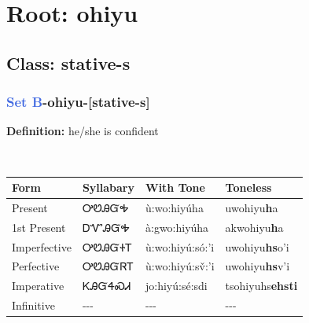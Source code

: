 \needspace{4in}
\section*{Root: ohiyu}
\nopagebreak
{}
\needspace{3in}
\subsection*{Class: stative-s}
\nopagebreak
\needspace{2in}
\subsubsection*{\textcolor{RoyalBlue}{Set B}{-}\textbf{ohiyu}{-}[stative-s]}
\nopagebreak
\textbf{Definition: } he/she is confident
\\[0.5em]
\begin{tabularx}{\textwidth}{l X X X}%
\toprule%
\textbf{Form}&\textbf{Syllabary}&\textbf{With Tone}&\textbf{Toneless}\\%
\midrule%
Present&ᎤᏬᎯᏳᎭ&ù:wo:hiyúha&uwohiyu\textbf{h}a\\%
1st Present&ᎠᏉᎯᏳᎭ&à:gwo:hiyúha&akwohiyu\textbf{h}a\\%
Imperfective&ᎤᏬᎯᏳᏐᎢ&ù:wo:hiyú:só:’i&uwohiyu\textbf{hs}o'i\\%
Perfective&ᎤᏬᎯᏳᏒᎢ&ù:wo:hiyú:sv̌:’i&uwohiyu\textbf{hs}v'i\\%
Imperative&ᏦᎯᏳᏎᏍᏗ&jo:hiyú:sé:sdi&tsohiyuhs\textbf{ehsti}\\%
Infinitive&{-}{-}{-}&{-}{-}{-}&{-}{-}{-}\\%
\bottomrule%
\end{tabularx}
\\[1em]